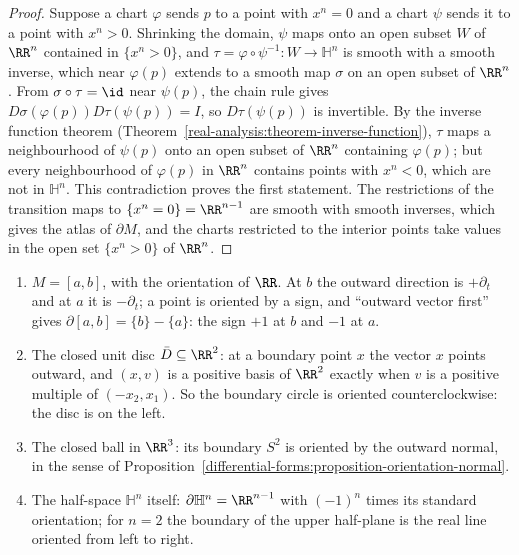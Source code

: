 \begin{proof}
Suppose a chart $\varphi$ sends $p$ to a point with $x^n = 0$ and a chart $\psi$ sends it to a point with $x^n > 0$. Shrinking the domain, $\psi$ maps onto an open subset $W$ of $\RR^n$ contained in
$\{x^n > 0\}$, and $\tau = \varphi \circ \psi^{-1} \colon W \to \mathbb{H}^n$ is smooth with a smooth inverse, which near $\varphi(p)$ extends to a smooth map $\sigma$ on an open subset of $\RR^n$.
From $\sigma \circ \tau = \id$ near $\psi(p)$, the chain rule gives $D\sigma(\varphi(p))D\tau(\psi(p)) = I$, so $D\tau(\psi(p))$ is invertible. By the inverse function theorem
(Theorem~\ref{real-analysis:theorem-inverse-function}), $\tau$ maps a neighbourhood of $\psi(p)$ onto an open subset of $\RR^n$ containing $\varphi(p)$; but every neighbourhood of $\varphi(p)$ in
$\RR^n$ contains points with $x^n < 0$, which are not in $\mathbb{H}^n$. This contradiction proves the first statement. The restrictions of the transition maps to $\{x^n = 0\} = \RR^{n-1}$ are
smooth with smooth inverses, which gives the atlas of $\partial M$, and the charts restricted to the interior points take values in the open set $\{x^n > 0\}$ of $\RR^n$.
\end{proof}

\begin{example}\label{differential-forms:example-boundaries}
\begin{enumerate}
\item $M = [a, b]$, with the orientation of $\RR$. At $b$ the outward direction is $+\partial_t$ and at $a$ it is $-\partial_t$; a point is oriented by a sign, and ``outward vector first''
gives $\partial[a, b] = \{b\} - \{a\}$: the sign $+1$ at $b$ and $-1$ at $a$.
\item The closed unit disc $\bar D \subseteq \RR^2$: at a boundary point $x$ the vector $x$ points outward, and $(x, v)$ is a positive basis of $\RR^2$ exactly when $v$ is a positive multiple of
$(-x_2, x_1)$. So the boundary circle is oriented counterclockwise: the disc is on the left.
\item The closed ball in $\RR^3$: its boundary $S^2$ is oriented by the outward normal, in the sense of Proposition~\ref{differential-forms:proposition-orientation-normal}.
\item The half-space $\mathbb{H}^n$ itself: $\partial\mathbb{H}^n = \RR^{n-1}$ with $(-1)^n$ times its standard orientation; for $n = 2$ the boundary of the upper half-plane is the
real line oriented from left to right.
\end{enumerate}
\end{example}

